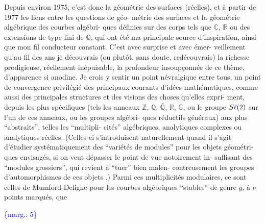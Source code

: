 \documentclass[11pt]{article}
\newcommand{\scanpage}[1]{\par\bigskip\noindent{\small\sffamily[scan #1]}\par}
\newcommand{\mspage}[1]{{\small\sffamily[p.\,#1]}}
\newcommand{\hand}[1]{\textcolor{blue}{#1}}
\newcommand{\margin}[1]{\textcolor{blue}{\{\textsf{marg.:} #1\}}}
\begin{document}
Depuis environ 1975, c'est donc la géométrie des surfaces
(réelles), et à partir de 1977 les liens entre les questions de géo-%
métrie des surfaces et la géométrie algébrique des courbes algébri-%
ques définies sur des corps tels que $\mathbb{C}$, $\mathbb{R}$ ou des extensions de type
fini de $\mathbb{Q}$, qui ont été ma principale source d'inspiration, ainsi
que mon fil conducteur constant. C'est avec surprise et avec émer-%
veillement qu'au fil des ans je découvrais (ou plutôt, sans doute,
redécouvrais) la richesse prodigieuse, réellement inépuisable, la
profondeur insoupçonnée de ce thème, d'apparence si anodine. Je crois
y sentir un point névralgique entre tous, un point de convergence
privilégié des principaux courants d'idées mathématiques, comme aussi
des principales structures et des visions des choses qu'elles expri-%
ment, depuis les plus spécifiques (tels les anneaux $\mathbb{Z}$, $\mathbb{Q}$, $\bar{\mathbb{Q}}$, $\mathbb{R}$, $\mathbb{C}$,
ou le groupe $S\hand{\ell}(2)$ sur l'un de ces anneaux, ou les groupes algébri-%
ques réductifs généraux) aux plus ``abstraits'', telles les ``multipli-%
cités'' algébriques, analytiques complexes ou analytiques réelles.
(Celles-ci s'introduisent naturellement quand il s'agit d'étudier
systématiquement des ``variétés de modules'' pour les objets géométri-%
ques envisagés, si on veut dépasser le point de vue notoirement in-%
suffisant des ``modules grossiers'', qui revient à ``tuer'' bien malen-%
contreusement les groupes d'automorphismes de ces objets .) Parmi ces
multiplicités modulaires, ce sont celles de Mumford-Deligne pour les
courbes algébriques ``stables'' de genre $g$, à $\nu$ points marqués, que

\margin{5}

\clearpage
\scanpage{119/6}
\mspage{4}
\end{document}
